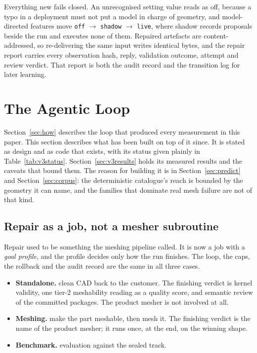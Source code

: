 \documentclass[10pt,onecolumn]{article}
\newcommand{\topic}[1]{\textbf{#1.}\hspace{0.5em}\ignorespaces}
\newcommand{\code}[1]{\texttt{\small #1}}
\begin{document}
Everything new fails closed. An unrecognised setting value reads as off, because a typo in a
deployment must not put a model in charge of geometry, and model-directed features move \code{off}
$\rightarrow$ \code{shadow} $\rightarrow$ \code{live}, where shadow records proposals beside the run
and executes none of them. Repaired artefacts are content-addressed, so re-delivering the same input
writes identical bytes, and the repair report carries every observation hash, reply, validation
outcome, attempt and review verdict. That report is both the audit record and the transition log
for later learning.

\section{The Agentic Loop}\label{sec:v3}

Section~\ref{sec:how} describes the loop that produced every measurement in this paper. This
section describes what has been built on top of it since. It is stated as design and as code
that exists, with its status given plainly in Table~\ref{tab:v3status}. Section~\ref{sec:v3results}
holds its measured results and the caveats that bound them. The reason for
building it is in Section~\ref{sec:predict} and Section~\ref{sec:corpus}: the deterministic
catalogue's reach is bounded by the geometry it can name, and the families that dominate real
mesh failure are not of that kind.

\subsection{Repair as a job, not a mesher subroutine}\label{sec:goals}

Repair used to be something the meshing pipeline called. It is now a job with a \emph{goal
profile}, and the profile decides only how the run finishes. The loop, the caps, the rollback and
the audit record are the same in all three cases.

\begin{itemize}
  \item \topic{Standalone} clean CAD back to the customer. The finishing verdict is kernel
        validity, one tier-2 meshability reading as a quality score, and semantic review of the
        committed packages. The product mesher is not involved at all.
  \item \topic{Meshing} make the part meshable, then mesh it. The finishing verdict is the name of
        the product mesher; it runs once, at the end, on the winning shape.
  \item \topic{Benchmark} evaluation against the sealed track.
\end{itemize}
\end{document}
